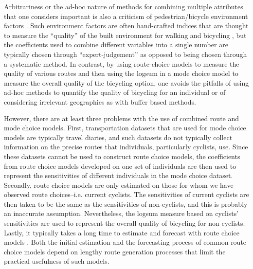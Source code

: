 Arbitrariness or the ad-hoc nature of methods for combining multiple attributes that one considers important is also a criticism of pedestrian/bicycle environment factors \citep{ewing_travel_2001}. Such environment factors are often hand-crafted indices that are thought to measure the ``quality'' of the built environment for walking and bicycling \citep{replogle_integrating_1995}, but the coefficients used to combine different variables into a single number are typically chosen through ``expert-judgement'' as opposed to being chosen through a systematic method. In contrast, by using route-choice models to measure the quality of various routes and then using the logsum in a mode choice model to measure the overall quality of the  bicycling option, one avoids the pitfalls of using ad-hoc methods to quantify the quality of bicycling for an individual or of considering irrelevant geographies as with buffer based methods. 

However, there are at least three problems with the use of combined route and mode choice models. First, transportation datasets that are used for mode choice models are typically travel diaries, and such datasets do not typically collect information on the precise routes that individuals, particularly cyclists, use. Since these datasets cannot be used to construct route choice models, the coefficients from route choice models developed on one set of individuals are then used to represent the sensitivities of different individuals in the mode choice dataset. Secondly, route choice models are only estimated on those for whom we have observed route choices--i.e. current cyclists. The sensitivities of current cyclists are then taken to be the same as the sensitivities of non-cyclists, and this is probably an inaccurate assumption. Nevertheless, the logsum measure based on cyclists' sensitivities are used to represent the overall quality of bicycling for non-cyclists. Lastly, it typically takes a long time to estimate and forecast with route choice models \citep{nassir_choice_2014}. Both the initial estimation and the forecasting process of common route choice models depend on lengthy route generation processes that limit the practical usefulness of such models.

